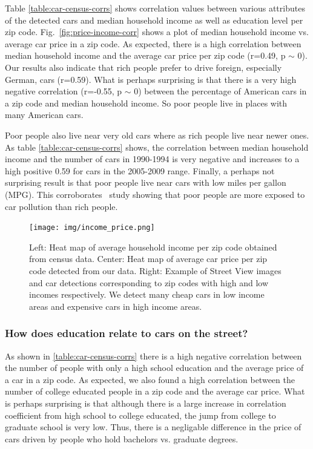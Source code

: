 \documentclass[10pt,twocolumn,letterpaper]{article}
\begin{document}
Table \ref{table:car-census-corrs} shows correlation values between various attributes of the detected cars and median household income as well as education level per zip code. Fig.~\ref{fig:price-income-corr} shows a plot of median household income vs. average car price in a zip code. As expected, there is a high correlation between median household income and the average car price per zip code (r=0.49, p \(\sim\) 0). Our results also indicate that rich people prefer to drive foreign, especially German, cars (r=0.59). What is perhaps surprising is that there is a very high negative correlation (r=-0.55, p \(\sim\) 0) between the percentage of American cars in a zip code and median household income. So poor people live in places with many American cars.

Poor people also live near very old cars where as rich people live near newer ones. As table \ref{table:car-census-corrs} shows, the correlation between median household income and the number of cars in 1990-1994 is very negative and increases to a high positive 0.59 for cars in the 2005-2009 range. Finally, a perhaps not surprising result is that poor people live near cars with low miles per gallon (MPG). This corroborates~\cite{cal-traffic-study} study showing that poor people are more exposed to car pollution than rich people.
 
\begin{figure}[t]
\begin{center}
    \texttt{[image: img/income\_price.png]}
\end{center}
   \caption {Left: Heat map of average household income per zip code obtained from census data. Center: Heat map of average car price per zip code detected from our data. Right: Example of Street View images and car detections corresponding to zip codes with high and low incomes respectively. We detect many cheap cars in low income areas and expensive cars in high income areas.}
\label{fig:bos-sf-vis}
\end{figure}

\subsubsection{How does education relate to cars on the street?}
As shown in \ref{table:car-census-corrs} there is a high negative correlation between the number of people with only a high school education and the average price of a car in a zip code. As expected, we also found a high correlation between the number of college educated people in a zip code and the average car price. What is perhaps surprising is that although there is a large increase in correlation coefficient from high school to college educated, the jump from college to graduate school is very low. Thus, there is a negligable difference in the price of cars driven by people who hold bachelors vs. graduate degrees.
\end{document}
